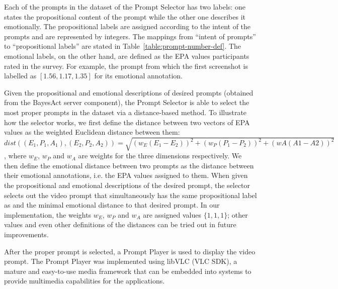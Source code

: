 Each of the prompts in the dataset of the Prompt Selector has two labels: one states the propositional content of the prompt while the other one describes it emotionally. The propositional labels are assigned according to the intent of the prompts and are represented by integers. The mappings from ``intent of prompts'' to ``propositional labels'' are stated in Table~\ref{table:prompt-number-def}. The emotional labels, on the other hand, are defined as the EPA values participants rated in the survey. For example, the prompt from which the first screenshot is labelled as $[1.56, 1.17, 1.35]$ for its emotional annotation.

Given the propositional and emotional descriptions of desired prompts (obtained from the BayesAct server component), the Prompt Selector is able to select the most proper prompts in the dataset via a distance-based method. To illustrate how the selector works, we first define the distance between two vectors of EPA values as the weighted Euclidean distance between them: \newline
$dist((E_1, P_1, A_1), (E_2, P_2, A_2))=\sqrt{(w_E(E_1-E_2))^2+(w_P(P_1-P_2))^2+(wA(A1-A2))^2}$,
where $w_E$, $w_P$ and $w_A$ are weights for the three dimensions respectively. We then define the emotional distance between two prompts as the distance between their emotional annotations, i.e. the EPA values assigned to them. When given the propositional and emotional descriptions of the desired prompt, the selector selects out the video prompt that simultaneously has the same propositional label as and the minimal emotional distance to that desired prompt. In our implementation, the weights $w_E$, $w_P$ and $w_A$ are assigned values $\{1, 1, 1\}$; other values and even other definitions of the distances can be tried out in future improvements.

After the proper prompt is selected, a Prompt Player is used to display the video prompt. The Prompt Player was implemented using libVLC (VLC SDK), a mature and easy-to-use media framework that can be embedded into systems to provide multimedia capabilities for the applications.




